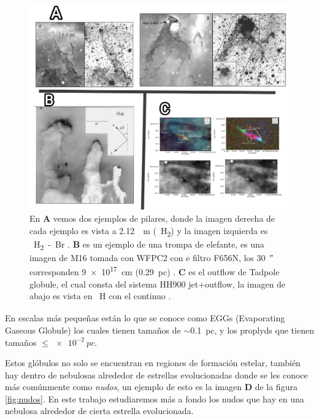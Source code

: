 \documentclass{book}
\begin{document}
\begin{figure}[h]
    \centering
    \includegraphics[width=1 \textwidth]{images Chapter 1/C1_Pillars.jpg}
    \caption{En \textbf{A} vemos dos ejemplos de pilares, donde la imagen derecha de cada ejemplo es vista a \SI{2.12}{\mu m} (\SI{}{H_2}) y la imagen izquierda es \SI{}{H_2-Br_{\gamma}} \citep{Hartigan:2015}. \textbf{B} es un ejemplo de una trompa de elefante, es una imagen de M16 tomada con WFPC2 con e filtro F656N, los \SI{30}{\arcsecond} corresponden \SI{9e17}{cm} (\SI{0.29}{pc}) \citep{JJHester:1996}. \textbf{C} es el outflow de Tadpole globule, el cual consta del sistema HH900 jet+outflow, la imagen de abajo es vista en \SI{}{H_\alpha} con el continuo 
    \citep{MeganReiter:2019}. }
    \label{fig:Pillars}
\end{figure}

En escalas más pequeñas están lo que se conoce como EGGs (Evaporating Gaseous Globule) los cuales tienen tamaños de $\sim$\SI{0.1}{pc}, y los proplyds que tienen tamaños $\le\SI{e-2}{pc}$. 


Estos glóbulos no solo se encuentran en regiones de formación estelar, también hay dentro de nebulosas alrededor de estrellas evolucionadas donde se les conoce más comúnmente como \textit{nudos}, un ejemplo de esto es la imagen \textbf{D} de la figura \ref{fig:nudos}. En este trabajo estudiaremos más a fondo los nudos que hay en una nebulosa alrededor de cierta estrella evolucionada.
\end{document}
